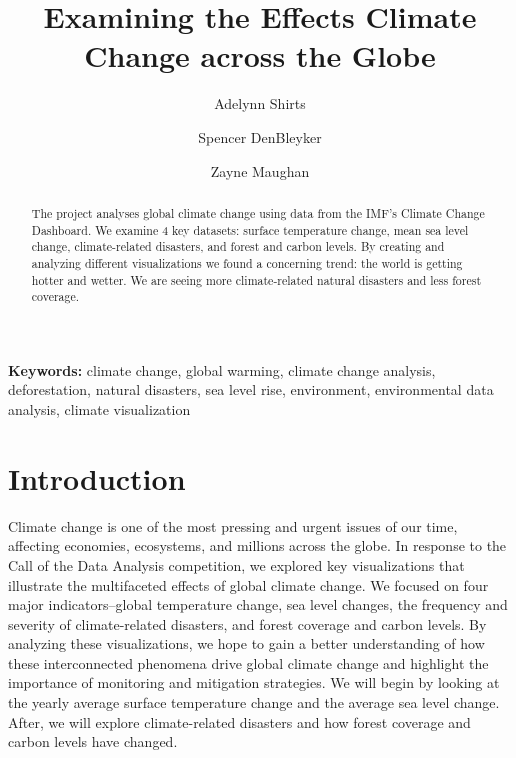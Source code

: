 \documentclass[10pt]{article}
\title{Examining the Effects Climate Change across the Globe}
\author{Adelynn Shirts \and Spencer DenBleyker \and Zayne Maughan}
\begin{document}
\renewcommand{\topfraction}{1.0}
\renewcommand{\bottomfraction}{1.0}
\renewcommand{\textfraction}{0.0}
\renewcommand{\floatpagefraction}{1.0}
\renewcommand{\dbltopfraction}{1.0}


\maketitle

\begin{abstract}
The project analyses global climate change using data from the IMF's Climate Change Dashboard. We examine 4 key datasets: surface temperature change, mean sea level change, climate-related disasters, and forest and carbon levels. By creating and analyzing different visualizations we found a concerning trend: the world is getting hotter and wetter. We are seeing more climate-related natural disasters and less forest coverage.  
\end{abstract}

{\small
\noindent\textbf{Keywords:}
climate change, global warming, climate change analysis, deforestation, natural disasters, sea level rise, environment, environmental data analysis, climate visualization}



\section{Introduction}
\label{Introduction}
Climate change is one of the most pressing and urgent issues of our time, affecting economies, ecosystems, and millions across the globe. In response to the Call of the Data Analysis competition, we explored key visualizations that illustrate the multifaceted effects of global climate change. We focused on four major indicators--global temperature change, sea level changes, the frequency and severity of climate-related disasters, and forest coverage and carbon levels. By analyzing these visualizations, we hope to gain a better understanding of how these interconnected phenomena drive global climate change and highlight the importance of monitoring and mitigation strategies. We will begin by looking at the yearly average surface temperature change and the average sea level change. After, we will explore climate-related disasters and how forest coverage and carbon levels have changed. 


\end{document}
